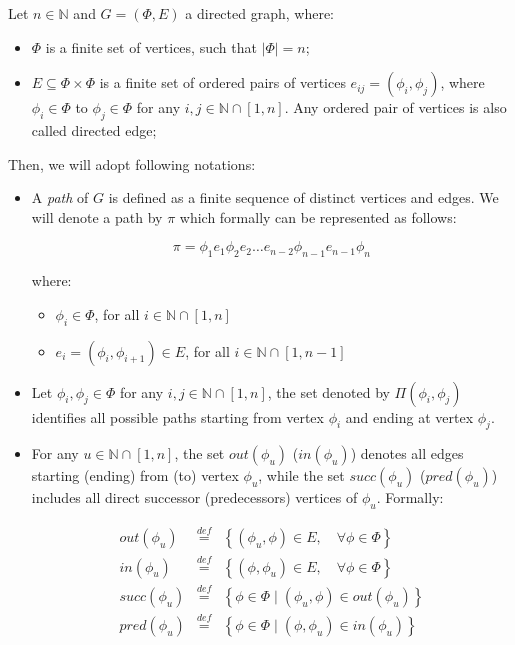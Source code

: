 \documentclass[10pt,a4paper]{report}
\newcommand*{\N}{\mathbb{N}}
\newcommand{\mathDef}{\overset{\textit{def}}{=}}
\theoremstyle{definition}
\begin{document}
Let $n \in \N$ and $G = (\Phi,E)$ a directed graph, where:

\begin{itemize}
	\item $\Phi$ is a finite set of vertices, such that $|\Phi| = n$;
	\item  $E \subseteq \Phi \times \Phi $ is a finite set of ordered pairs of vertices $e_{ij} = \left( \phi_i, \phi_j \right)$, where $\phi_i \in \Phi$ to $\phi_j \in \Phi$ for any $i,j \in \N \cap \left[ 1, n \right]$. Any ordered pair of vertices is also called directed edge;
\end{itemize}

Then, we will adopt following notations:

\begin{itemize}
	\item A \textit{path} of $G$ is defined as a finite sequence of distinct vertices and edges. We will denote a path by $\pi$ which formally can be represented as follows:
	
	\begin{equation}
		\pi = \phi_1 e_1 \phi_2 e_2 \ldots e_{n-2}\phi_{n-1} e_{n-1} \phi_n
	\end{equation}
	
	where:
	
	\begin{itemize}
		\item $\phi_i \in \Phi$, for all $i \in \N \cap \left[ 1, n \right]$
		\item $e_i = \left( \phi_i, \phi_{i+1} \right) \in E$, for all $i \in \N \cap \left[ 1, n-1 \right]$
	\end{itemize}
	
	\item Let $\phi_i,\phi_j \in \Phi$ for any $i,j \in \N \cap \left[ 1, n \right]$, the set denoted by $\Pi(\phi_i, \phi_j)$ identifies all possible paths starting from vertex $\phi_i$ and ending at vertex $\phi_j$.
	
	\item For any $u \in \N \cap \left[ 1, n \right]$, the set $out(\phi_u)$ ($in(\phi_u)$) denotes all edges starting (ending) from (to) vertex $\phi_u$, while the set $succ(\phi_u)$ ($pred(\phi_u)$) includes all direct successor (predecessors) vertices of $\phi_u$. Formally:
	
	\begin{eqnarray}\label{outDef}
		out(\phi_u) & \mathDef & \left\lbrace (\phi_u, \phi) \in E, \quad \forall \phi \in \Phi  \right\rbrace \\
		in(\phi_u) & \mathDef & \left\lbrace (\phi, \phi_u) \in E, \quad \forall \phi \in \Phi  \right\rbrace \\
		succ(\phi_u) & \mathDef & \left\lbrace \phi \in \Phi \mid (\phi_u, \phi) \in out(\phi_u)  \right\rbrace \\
		pred(\phi_u) & \mathDef & \left\lbrace \phi \in \Phi \mid (\phi, \phi_u) \in in(\phi_u)  \right\rbrace 
	\end{eqnarray}
	
	
\end{itemize}
\end{document}

